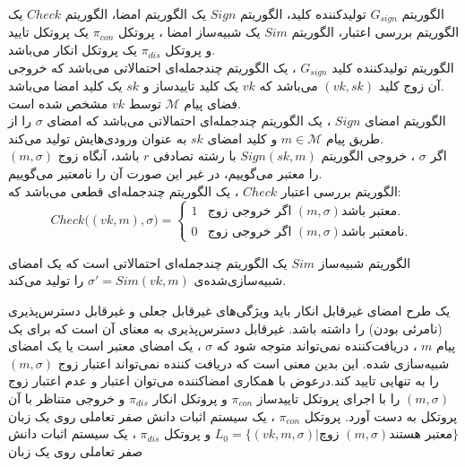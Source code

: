 \documentclass[12pt,a4paper]{article}
\theoremstyle{plain}
\theoremstyle{definition}
\theoremstyle{remark}
\begin{document}
الگوریتم
$G_{sign}$
تولیدکننده کلید، الگوریتم
$Sign$
یک الگوریتم امضا، الگوریتم 
$Check$
یک الگوریتم بررسی اعتبار، الگوریتم
$Sim$
یک شبیه‌ساز امضا ، پروتکل 
$\pi_{con}$
یک پروتکل تایید و پروتکل 
$\pi_{dis}$
یک پروتکل انکار می‌باشد.
\\
الگوریتم تولیدکننده کلید 
$G_{sign}$
، یک الگوریتم چندجمله‌ای احتمالاتی 
می‌باشد که خروجی آن زوج کلید
$(vk,sk)$
می‌باشد که 
$vk$
یک کلید تاییدساز و 
$sk$
یک کلید امضا 
می‌باشد.
\\
 فضای پیام 
$\mathcal{M}$
توسط 
$vk$
مشخص شده است.
\\
 الگوریتم امضای
$Sign$
، یک الگوریتم چندجمله‌ای احتمالاتی می‌باشد که امضای 
$\sigma$
را از طریق پیام 
$m \in \mathcal{M}$
 و کلید امضای 
$sk$
 به عنوان ورودی‌هایش تولید می‌کند.
 \\
  اگر 
$\sigma$
 ، خروجی الگوریتم
$Sign(sk,m)$
با رشته تصادفی 
$r$
باشد، آنگاه زوج 
$(m,\sigma)$
را معتبر می‌گوییم، در غیر این صورت آن را نامعتیر می‌گوییم.
\\
الگوریتم بررسی اعتبار
$Check$
، یک الگوریتم چندجمله‌ای قطعی می‌باشد که:
$$ Check \big( (vk,m),\sigma \big) = 
	\begin{cases}
		1 & \text{
			اگر خروجی زوج 
			$(m,\sigma)$
			معتبر باشد.
				} \\
			0 & \text{
				اگر خروجی زوج 
				$(m,\sigma)$
				نامعتبر باشد.
			}
	\end{cases}
$$

الگوریتم شبیه‌ساز
$Sim$
یک الگوریتم چندجمله‌ای احتمالاتی است که یک امضای شبیه‌سازی‌شده‌ی
${\sigma}' = Sim(vk,m)$
را تولید می‌کند.

یک طرح امضای غیرقابل انکار باید ویژگی‌های غیرقابل جعلی
و غیرقابل دسترس‌پذیری (نامرئی بودن)
را داشته باشد. غیرقابل دسترس‌پذیری به معنای آن است که برای یک پیام 
$m$
، دریافت‌کننده نمی‌تواند متوجه شود که 
$\sigma$
، یک امضای معتبر است یا یک امضای شبیه‌سازی شده. این بدین معنی است که دریافت کننده نمی‌تواند اعتبار زوج 
$(m,\sigma)$
را به تنهایی تایید کند.درعوض با همکاری امضاکننده می‌توان اعتبار و عدم اعتبار زوج 
$(m,\sigma)$
را با اجرای پروتکل تاییدساز
$\pi_{con}$
و پروتکل انکار
$\pi_{dis}$
و خروجی متناظر با آن پروتکل به دست آورد. پروتکل
$\pi_{con}$ 
، یک سیستم اثبات دانش صفر تعاملی
روی یک زبان 
$L_0 = \{ (vk,m,\sigma) | 
\text{زوچ 
$(m,\sigma)$
معتبر هستند
}
\}$
 و پروتکل 
$\pi_{dis}$
، یک سیستم اثبات دانش صفر تعاملی روی یک زبان 
\end{document}
